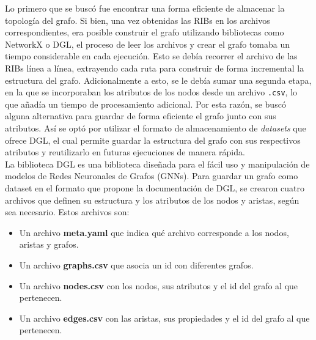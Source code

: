 Lo primero que se buscó fue encontrar una forma eficiente de almacenar la topología del grafo. Si bien, una vez obtenidas las RIBs en los archivos correspondientes, era posible construir el grafo utilizando bibliotecas como NetworkX o DGL, el proceso de leer los archivos y crear el grafo tomaba un tiempo considerable en cada ejecución. Esto se debía recorrer el archivo de las RIBs línea a línea, extrayendo cada ruta para construir de forma incremental la estructura del grafo. Adicionalmente a esto, se le debía sumar una segunda etapa, en la que se incorporaban los atributos de los nodos desde un archivo \texttt{.csv}, lo que añadía un tiempo de procesamiento adicional. Por esta razón, se buscó alguna alternativa para guardar de forma eficiente el grafo junto con sus atributos. Así se optó por utilizar el formato de almacenamiento de \textit{datasets} que ofrece DGL, el cual permite guardar la estructura del grafo con sus respectivos atributos y reutilizarlo en futuras ejecuciones de manera rápida.\\

La biblioteca DGL es una biblioteca diseñada para el fácil uso y manipulación de modelos de Redes Neuronales de Grafos (GNNs). Para guardar un grafo como dataset en el formato que propone la documentación de DGL, se crearon cuatro archivos que definen su estructura y los atributos de los nodos y aristas, según sea necesario. Estos archivos son:

\begin{itemize}
    \item Un archivo \textbf{meta.yaml} que indica qué archivo corresponde a los nodos, aristas y grafos.
    \item Un archivo \textbf{graphs.csv} que asocia un id con diferentes grafos.
    \item Un archivo \textbf{nodes.csv} con los nodos, sus atributos y el id del grafo al que pertenecen.
    \item Un archivo \textbf{edges.csv} con las aristas, sus propiedades y el id del grafo al que pertenecen.
\end{itemize}


















